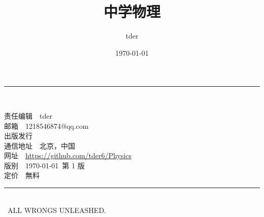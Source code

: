 \documentclass{ctexbook}
\title{\huge\textbf{中学物理}}
\author{tder}
\date{\today}
\begin{document}
\begin{titlepage}

\maketitle
\thispagestyle{empty}

\hspace{1pt}
\vfill
\begingroup
\raggedright\rule{14cm}{1pt}\vspace{5pt} \\
\raggedright\noindent
责任编辑~~tder \\
邮\hspace{2em}箱~~1218546874@qq.com \\
出版发行~~\XeLaTeX \\
通信地址~~北京，中国 \\
网\hspace{2em}址~~{\color{blue}\url{https://github.com/tder6/Physics}} \\
版\hspace{2em}别~~\today~第 1 版 \\
定\hspace{2em}价~~無料 \\
\raggedright\rule{14cm}{1pt}\vspace{5pt} \\
\textcopyleft~ALL WRONGS UNLEASHED.
\endgroup

\end{titlepage}

\setcounter{page}{0}
\tableofcontents


\newpage
\setcounter{page}{1}



\end{document}
